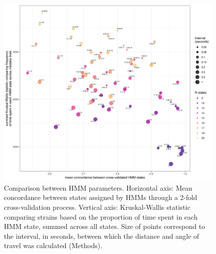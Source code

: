 \documentclass[
]{article}
\begin{document}
\begin{figure}
\includegraphics[width=1\linewidth]{figs/mikk_behaviour/compare_params} \caption{Comparison between HMM parameters. Horizontal axis: Mean concordance between states assigned by HMMs through a 2-fold cross-validation process. Vertical axis: Kruskal-Wallis statistic comparing strains based on the proportion of time spent in each HMM state, summed across all states. Size of points correspond to the interval, in seconds, between which the distance and angle of travel was calculated (Methods).}\label{fig:mikk-param-comp}
\end{figure}
\end{document}

